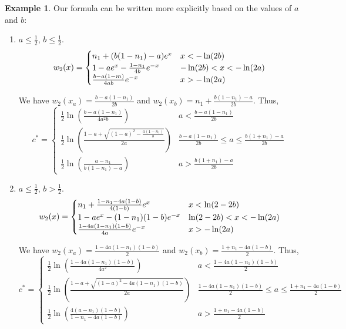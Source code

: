 \documentclass[11pt]{article}
\theoremstyle{definition}
\newtheorem{ex}[thm]{Example}
\numberwithin{equation}{section}
\numberwithin{thm}{section}
\renewcommand{\a}{a}
\renewcommand{\b}{b}
\newcommand{\m}{n_1}
\begin{document}
\begin{ex}
Our formula can be written more explicitly based on the values of $\a$ and $\b$:
\begin{enumerate}[{Case} 1.]

\item $\a\leq\frac{1}{2}$, $\b\leq\frac{1}{2}$.
\begin{equation}
w_2(x) = \begin{cases}
\m + (\Conecaseone) e^x  & x < -\ln(2\b) \\
1 - \Ctwocaseone e^x - \Cthreecaseone e^{-x} & -\ln(2\b) < x < -\ln(2\a) \\
\Cfourcaseone e^{-x} & x > -\ln(2\a)
\end{cases}
\end{equation}

We have $w_2(x_\a)=\frac{\b-\a(1-\m)}{2\b}$ and $w_2(x_\b)=\m + \frac{\b(1-\m)-\a}{2\b}$. Thus,
\begin{equation}
c^* = \begin{cases}
\frac{1}{2} \ln \left( \frac{\b-\a(1-\m)}{4\a^2\b} \right) & \a < \frac{\b-\a(1-\m)}{2\b} \\
\frac{1}{2} \ln \left( \frac{1-\a + \sqrt{(1-\a)^2 - \frac{\a(1-\m)}{\b}}}{2\a} \right) & \frac{\b-\a(1-\m)}{2\b} \leq \a \leq \frac{\b(1+\m)-\a}{2\b} \\
\frac{1}{2} \ln \left( \frac{\a-\m}{\b(1-\m)-\a}\right) & \a > \frac{\b(1+\m)-\a}{2\b}
\end{cases}
\end{equation}


\item $\a\leq\frac{1}{2}$, $\b>\frac{1}{2}$.
\begin{equation}
w_2(x) = \begin{cases}
\m + \Conecasetwo e^x  & x < \ln(2-2\b) \\
1 - \Ctwocaseone e^x - \Cthreecasetwo e^{-x} & \ln(2-2\b) < x < -\ln(2\a) \\
\Cfourcasetwo e^{-x} & x > -\ln(2\a)
\end{cases}
\end{equation}

We have $w_2(x_\a)=\frac{1-4\a(1-\m)(1-\b)}{2}$ and $w_2(x_\b)=\frac{1+\m-4\a(1-\b)}{2}$. Thus,
\begin{equation}
c^* = \begin{cases}
\frac{1}{2} \ln \left( \frac{1-4\a(1-\m)(1-\b)}{4\a^2} \right) & a<\frac{1-4\a(1-\m)(1-\b)}{2} \\
\frac{1}{2} \ln \left( \frac{1-\a + \sqrt{(1-\a)^2 - 4\a(1-\m)(1-\b)}}{2\a} \right) & \frac{1-4\a(1-\m)(1-\b)}{2}\leq\a\leq\frac{1+\m-4\a(1-\b)}{2} \\
\frac{1}{2} \ln \left( \frac{4(\a-\m)(1-\b)}{1-\m-4\a(1-\b)}\right) & \a>\frac{1+\m-4\a(1-\b)}{2}
\end{cases}
\end{equation}



\end{enumerate}
\end{ex}
\end{document}
